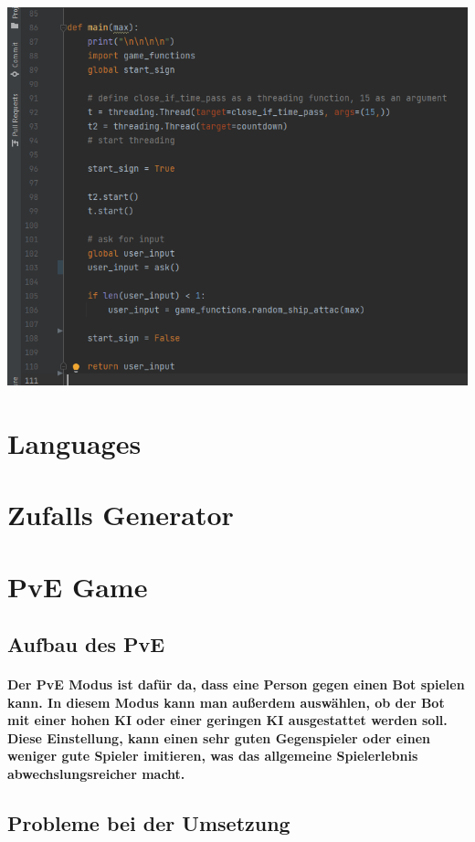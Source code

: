 \documentclass{article}
\begin{document}
\begin{center}
    \includegraphics[width=1.20\textwidth]{BSRNScreenshotCounter.png}
\end{center}


\section{Languages}
\section{Zufalls Generator}
\section{PvE Game}
\subsection{Aufbau des PvE}
\paragraph{Der PvE Modus ist dafür da, dass eine Person gegen einen Bot spielen kann. In diesem Modus kann man außerdem auswählen, ob der Bot mit einer hohen KI oder einer geringen KI ausgestattet werden soll. Diese Einstellung, kann einen sehr guten Gegenspieler oder einen weniger gute Spieler imitieren, was das allgemeine Spielerlebnis abwechslungsreicher macht.}
\subsection{Probleme bei der Umsetzung}
\end{document}
